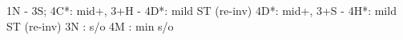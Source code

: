 1N - 3S;
4C*: mid+, 3+H
   - 4D*: mild ST (re-inv)
4D*: mid+, 3+S
   - 4H*: mild ST (re-inv)
3N : s/o
4M : min s/o